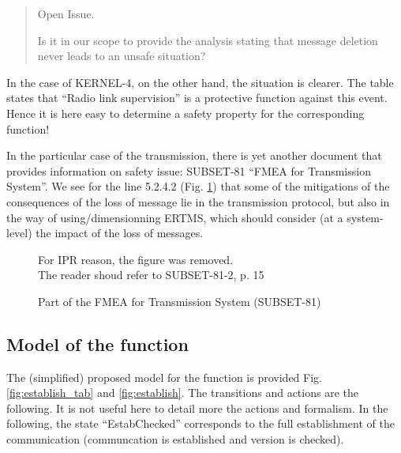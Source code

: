 \documentclass{template/openetcs_article}
\newenvironment{issue}{
	\begin{quote}
	\begin{itshape}Open Issue. 
}{
	\end{itshape}
	\end{quote}
}
\begin{document}
\begin{issue}
Is it in our scope to provide the analysis stating that message deletion never leads to 
an unsafe situation?
\end{issue}

In the case of KERNEL-4, on the other hand, the situation is clearer. The table states that 
``Radio link supervision'' is a protective function against this event. Hence it is here easy to
determine a safety property for the corresponding function!

In the particular case of the transmission, there is yet another document that provides 
information on safety issue: SUBSET-81 ``FMEA for Transmission System''. We see for the 
line 5.2.4.2 (Fig. \ref{fig:fmea}) that some of the mitigations of the consequences of the loss
of message lie in the transmission protocol, but also in the way of using/dimensionning ERTMS,
which should consider (at a system-level) the impact of the loss of messages.

\begin{figure}
  \centering
  {For IPR reason, the figure was removed. \\
  The reader shoud refer to SUBSET-81-2, p. 15}
  \caption{Part of the FMEA for Transmission System (SUBSET-81)}
  \label{fig:fmea}
\end{figure}

\subsection{Model of the function}
The (simplified) proposed model for the function is provided Fig. \ref{fig:establish_tab} and 
\ref{fig:establish}. The transitions and actions are the following. It is not useful here to detail
more the actions and formalism. In the following, the state ``EstabChecked'' corresponds to the full establishment of the communication (communcation is established and version is checked).
\end{document}
